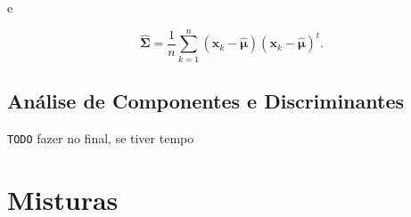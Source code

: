 \documentclass[a4paper,12pt,twocolumn]{article}
\begin{document}
\noindent e

\begin{equation}
    \boldsymbol{\hat{\Sigma}} = \frac{1}{n} \sum_{k=1}^n (\boldsymbol{x}_k - \boldsymbol{\hat{\mu}})(\boldsymbol{x}_k - \boldsymbol{\hat{\mu}})^t.
    \label{eq:bold_sigma_optimum_case_2}
\end{equation}

\subsection{Análise de Componentes e Discriminantes}

\texttt{TODO} fazer no final, se tiver tempo

\section{Misturas}
\end{document}
